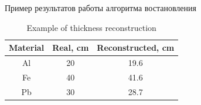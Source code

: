 \documentclass[a4paper]{panl}
\begin{document}
\begin{table}
    \caption{Пример результатов работы алгоритма востановления}
\begin{center}
        \begin{tabular}[c]{|c|c|c|}
        \hline 
        Material & Real, cm & Reconstructed, cm \\ 
        \hline 
        Al & 20 & 19.6 \\ 
        \hline 
        Fe & 40 & 41.6 \\ 
        \hline 
        Pb & 30 & 28.7 \\ 
        \hline 
    \end{tabular}
\end{center}
\caption{Example of thickness reconstruction}
    \label{tab:rec}
\end{table}
\end{document}
